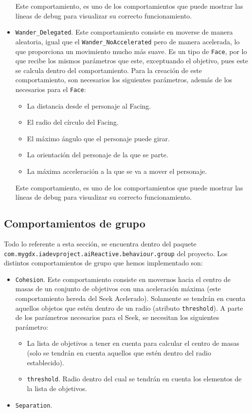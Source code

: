 \begin{itemize}
 Este comportamiento, es uno de los comportamientos que puede mostrar las líneas de debug para visualizar su correcto funcionamiento. 

 
 \item \texttt{Wander\_Delegated}. Este comportamiento consiste en moverse de manera aleatoria, igual que el \texttt{Wander\_NoAccelerated} pero de manera acelerada, lo que proporciona un movimiento mucho más suave. Es un tipo de \texttt{Face}, por lo que recibe los mismos parámetros que este, exceptuando el objetivo, pues este se calcula dentro del comportamiento. Para la creación de este comportamiento, son necesarios los siguientes parámetros, además de los necesarios para el \texttt{Face}:
 \begin{itemize}
  \item La distancia desde el personaje al Facing.
  \item El radio del círculo del Facing.
  \item El máximo ángulo que el personaje puede girar.
  \item La orientación del personaje de la que se parte.
  \item La máxima acceleración a la que se va a mover el personaje.
 \end{itemize}
 Este comportamiento, es uno de los comportamientos que puede mostrar las líneas de debug para visualizar su correcto funcionamiento. 

\end{itemize}

\medskip
\subsection{Comportamientos de grupo}
Todo lo referente a esta sección, se encuentra dentro del paquete \\ \texttt{com.mygdx.iadevproject.aiReactive.behaviour.group} del proyecto. Los distintos comportamientos de grupo que hemos implementado son:
\begin{itemize}
 \item \texttt{Cohesion}. Este comportamiento consiste en movernos hacia el centro de masas de un conjunto de objetivos con una aceleración máxima (este comportamiento hereda del Seek Acelerado). Solamente se tendrán en cuenta aquellos objetos que estén dentro de un radio (atributo \texttt{threshold}). A parte de los parámetros necesarios para el Seek, se necesitan los siguientes parámetro:
 \begin{itemize}
 	\item La lista de objetivos a tener en cuenta para calcular el centro de masas (solo se tendrán en cuenta aquellos que estén dentro del radio establecido).
 	\item \texttt{threshold}. Radio dentro del cual se tendrán en cuenta los elementos de la lista de objetivos.
 \end{itemize}
 \item \texttt{Separation}.
\end{itemize}

